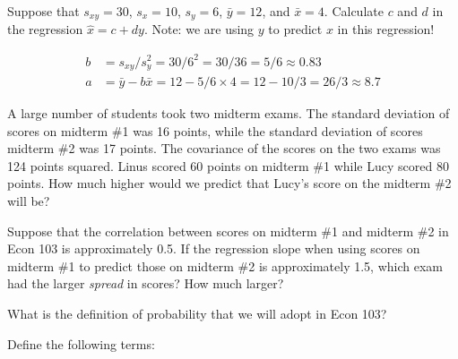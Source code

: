 \documentclass[addpoints,12pt]{exam}
\begin{document}
\begin{questions}
\question Suppose that $s_{xy} = 30$, $s_x = 10$, $s_{y} = 6$, $\bar{y} = 12$, and $\bar{x} = 4$. Calculate $c$ and $d$ in the regression $\widehat{x} = c + dy$. Note: we are using $y$ to predict $x$ in this regression!
\begin{solution}
  \begin{align*}
  b &= s_{xy}/s_y^2 = 30 / 6^2 = 30/36 = 5/6 \approx 0.83\\ 
  a &= \bar{y} - b \bar{x} = 12 - 5/6 \times 4 = 12 - 10/3 = 26/3 \approx 8.7
  \end{align*}
\end{solution}

\question A large number of students took two midterm exams. The standard deviation of scores on midterm \#1 was 16 points, while the standard deviation of scores midterm \#2 was 17 points. The covariance of the scores on the two exams was 124 points squared. Linus scored 60 points on midterm \#1 while Lucy scored 80 points. How much higher would we predict that Lucy's score on the midterm \#2 will be?

\question Suppose that the correlation between scores on midterm \#1 and midterm \#2 in Econ 103 is approximately 0.5. If the regression slope when using scores on midterm \#1 to predict those on midterm \#2 is approximately 1.5, which exam had the larger \emph{spread} in scores? How much larger?


\question What is the definition of probability that we will adopt in Econ 103?

\question Define the following terms:



\end{questions}
\end{document}
